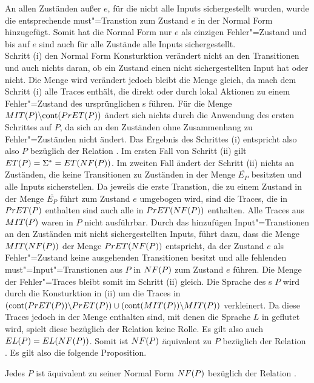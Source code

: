 An allen Zuständen außer $e$, für die nicht alle Inputs sichergestellt wurden,
wurde die entsprechende must"=Transtion zum Zustand $e$ in der Normal Form
hinzugefügt. Somit hat die Normal Form nur $e$ als einzigen Fehler"=Zustand und
bis auf $e$ sind auch für alle Zustände alle Inputs sichergestellt.\\
Schritt (i) den Normal Form Konsturktion verändert nicht an den Transitionen
und auch nichts daran, ob ein Zustand einen nicht sichergestellten Input hat
oder nicht. Die Menge \StET{} wird verändert jedoch bleibt die Menge \PrET{}
gleich, da \StET{} mach dem Schritt (i) alle Traces enthält, die direkt oder
durch lokal Aktionen zu einem Fehler"=Zustand des ursprünglichen \MEIO{}s
führen. Für die Menge $MIT (P)\backslash\mathrm{cont} (PrET (P))$ ändert sich nichts
durch die Anwendung des ersten Schrittes auf $P$, da sich an den Zuständen ohne
Zusammenhang zu Fehler"=Zuständen nicht ändert. Das Ergebnis des Schrittes (i)
entspricht also also $P$ bezüglich der Relation \ERel{}. Im ersten Fall von
Schritt (ii) gilt $ET (P) = \Sigma ^* = ET (NF (P))$. Im zweiten Fall ändert
der Schritt (ii) nichts an Zuständen, die keine Transitionen zu Zuständen in
der Menge $\overline{E _P}$ besitzten und alle Inputs sicherstellen. Da jeweils
die erste Transtion, die zu einem Zustand in der Menge $\overline{E _P}$ führt
zum Zustand $e$ umgebogen wird, sind die Traces, die in $PrET (P)$ enthalten
sind auch alle in $PrET (NF (P))$ enthalten. Alle Traces aus $MIT (P)$ waren
in $P$ nicht ausführbar. Durch das hinzufügen Input"=Transtionen an den
Zuständen mit nicht sichergestellten Inputs, führt dazu, dass die Menge $MIT
(NF (P))$ der Menge $PrET (NF (P))$ entspricht, da der Zustand $e$ als
Fehler"=Zustand keine ausgehenden Transitionen besitzt und alle fehlenden
must"=Input"=Transtionen aus $P$ in $NF (P)$ zum Zustand $e$ führen. Die Menge
der Fehler"=Traces \ET{} bleibt somit im Schritt (ii) gleich. Die Sprache des
\MEIO{}s $P$ wird durch die Konsturktion in (ii) um die Traces in $(\mathrm{cont}
(PrET (P))\backslash PrET (P)) \cup (\mathrm{cont} (MIT (P))\backslash MIT (P))$
verkleinert. Da diese Traces jedoch in der Menge \ET{} enthalten sind, mit
denen die Sprache $L$ in \EL{} geflutet wird, spielt diese bezüglich der
Relation \ERel{} keine Rolle. Es gilt also auch $EL (P) = EL (NF (P))$.
Somit ist $NF (P)$ äquivalent zu $P$ bezüglich der Relation \ERel{}. Es gilt
also die folgende Proposition.

\begin{Prop}
  Jedes \MEIO{} $P$ ist äquivalent zu seiner Normal Form $NF (P)$ bezüglich
  der Relation \ERel{}.
\end{Prop}

